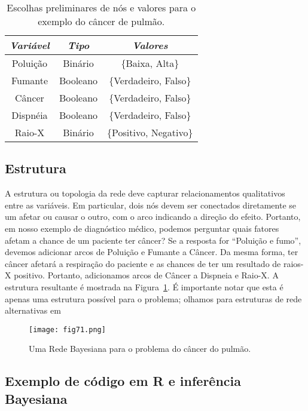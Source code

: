 \begin{table}[t]
    \caption{Escolhas preliminares de nós e valores para o exemplo do câncer de pulmão.}
    \centering
    \begin{tabular}{|c|c|c|}
    \hline
    \textit{Variável} & \textit{Tipo}  & \textit{Valores} \\ \hline
    Poluição & Binário & \{Baixa, Alta\} \\ \hline
    Fumante & Booleano & \{Verdadeiro, Falso\}      \\ \hline
    Câncer & Booleano & \{Verdadeiro, Falso\}      \\ \hline
    Dispnéia & Booleano & \{Verdadeiro, Falso\}      \\ \hline
    Raio-X & Binário  & \{Positivo, Negativo\}  \\ \hline
    \end{tabular}
    \label{tab:tab71}
\end{table}

\subsection{Estrutura}

A estrutura ou topologia da rede deve capturar relacionamentos qualitativos entre as variáveis. Em particular, dois nós devem ser conectados diretamente se um afetar ou causar o outro, com o arco indicando a direção do efeito. Portanto, em nosso exemplo de diagnóstico médico, podemos perguntar quais fatores afetam a chance de um paciente ter câncer? Se a resposta for “Poluição e fumo”, devemos adicionar arcos de Poluição e Fumante a Câncer. Da mesma forma, ter câncer afetará a respiração do paciente e as chances de ter um resultado de raios-X positivo. Portanto, adicionamos arcos de Câncer a Dispneia e Raio-X. A estrutura resultante é mostrada na Figura~\ref{fig:fig72}. É importante notar que esta é apenas uma estrutura possível para o problema; olhamos para estruturas de rede alternativas em

\begin{figure}[t]
    \texttt{[image: fig71.png]}
    \centering
    \caption{Uma Rede Bayesiana para o problema do câncer do pulmão.}
    \label{fig:fig72}
\end{figure}

\subsection{Exemplo de código em R e inferência Bayesiana}

